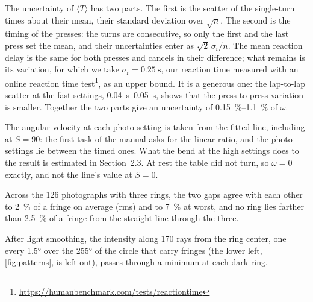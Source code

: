 The uncertainty of $\langle T\rangle$ has two parts. The first is the scatter of the single-turn times about their mean, their standard deviation over $\sqrt{n}$. The second is the timing of the presses: the turns are consecutive, so only the first and the last press set the mean, and their uncertainties enter as $\sqrt{2}\,\sigma_\mathrm{r}/n$. The mean reaction delay is the same for both presses and cancels in their difference; what remains is its variation, for which we take $\sigma_\mathrm{r} = \qty{0.25}{\second}$, our reaction time measured with an online reaction time test\footnote{\url{https://humanbenchmark.com/tests/reactiontime}}, as an upper bound. It is a generous one: the lap-to-lap scatter at the fast settings, \qtyrange{0.04}{0.05}{\second}, shows that the press-to-press variation is smaller. Together the two parts give an uncertainty of \qtyrange{0.15}{1.1}{\percent} of $\omega$.


The angular velocity at each photo setting is taken from the fitted line, including at $S = 90$: the first task of the manual asks for the linear ratio, and the photo settings lie between the timed ones. What the bend at the high settings does to the result is estimated in Section~2.3. At rest the table did not turn, so $\omega = 0$ exactly, and not the line's value at $S = 0$.


Across the 126 photographs with three rings, the two gaps agree with each other to \qty{2}{\percent} of a fringe on average (rms) and to \qty{7}{\percent} at worst, and no ring lies farther than \qty{2.5}{\percent} of a fringe from the straight line through the three.


After light smoothing, the intensity along 170 rays from the ring center, one every \ang{1.5} over the \ang{255} of the circle that carry fringes (the lower left, \cref{fig:patterns}, is left out), passes through a minimum at each dark ring.


